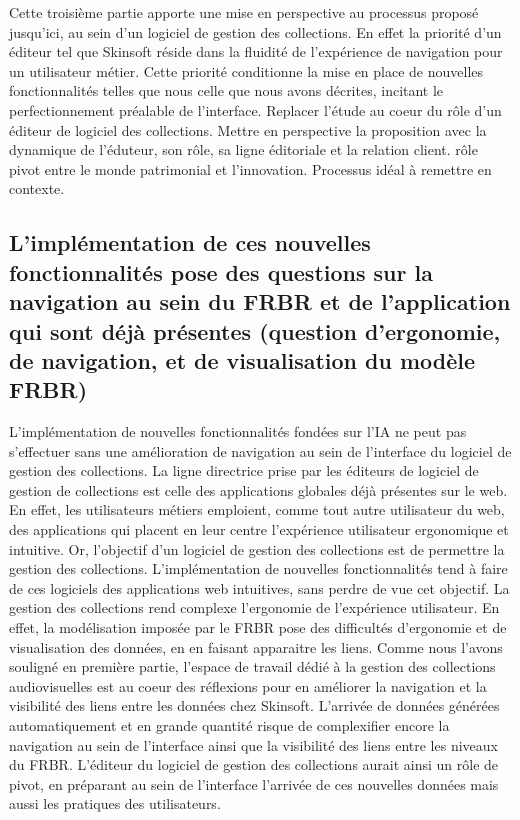 Cette troisième partie apporte une mise en perspective au processus proposé jusqu'ici, au sein d'un logiciel de gestion des collections. En effet la priorité d'un éditeur tel que Skinsoft réside dans la fluidité de l'expérience de navigation pour un utilisateur métier. Cette priorité conditionne la mise en place de nouvelles fonctionnalités telles que nous celle que nous avons décrites, incitant le perfectionnement préalable de l'interface. 
Replacer l'étude au coeur du rôle d'un éditeur de logiciel des collections. Mettre en perspective la proposition avec la dynamique de l'éduteur, son rôle, sa ligne éditoriale et la relation client. rôle pivot entre le monde patrimonial et l'innovation. Processus idéal à remettre en contexte. 


\subsection{L'implémentation de ces nouvelles fonctionnalités pose des questions sur la navigation au sein du FRBR et de l’application qui sont déjà présentes (question d’ergonomie, de navigation, et de visualisation du modèle FRBR)}

L'implémentation de nouvelles fonctionnalités fondées sur l'IA ne peut pas s'effectuer sans une amélioration de navigation au sein de l'interface du logiciel de gestion des collections. La ligne directrice prise par les éditeurs de logiciel de gestion de collections est celle des applications globales déjà présentes sur le web. En effet, les utilisateurs métiers emploient, comme tout autre utilisateur du web, des applications qui placent en leur centre l'expérience utilisateur ergonomique et intuitive. Or, l'objectif d'un logiciel de gestion des collections est de permettre la gestion des collections. L'implémentation de nouvelles fonctionnalités tend à faire de ces logiciels des applications web intuitives, sans perdre de vue cet objectif. La gestion des collections rend complexe l'ergonomie de l'expérience utilisateur. En effet, la modélisation imposée par le FRBR pose des difficultés d'ergonomie et de visualisation des données, en en faisant apparaitre les liens. Comme nous l'avons souligné en première partie, l'espace de travail dédié à la gestion des collections audiovisuelles est au coeur des réflexions pour en améliorer la navigation et la visibilité des liens entre les données chez Skinsoft. 
L'arrivée de données générées automatiquement et en grande quantité risque de complexifier encore la navigation au sein de l'interface ainsi que la visibilité des liens entre les niveaux du FRBR. 
L'éditeur du logiciel de gestion des collections aurait ainsi un rôle de pivot, en préparant au sein de l'interface l'arrivée de ces nouvelles données mais aussi les pratiques des utilisateurs. 


